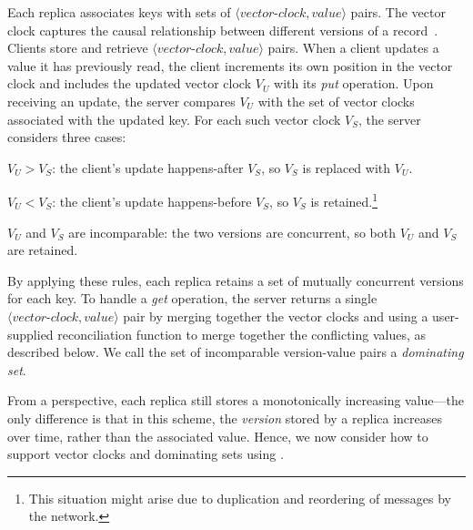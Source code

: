 Each replica associates keys with sets of
$\langle\textit{vector-clock},\textit{value}\rangle$ pairs. The vector clock
captures the causal relationship between different versions of a
record~\cite{Fidge1988,Mattern1989}. Clients store and retrieve
$\langle\textit{vector-clock},\textit{value}\rangle$ pairs. When a client
updates a value it has previously read, the client increments its own position
in the vector clock and includes the updated vector clock $V_U$ with its
\emph{put} operation. Upon receiving an update, the server compares $V_U$ with
the set of vector clocks associated with the updated key. For each such vector
clock $V_S$, the server considers three cases:
\begin{compactenum}
\item $V_U > V_S$: the client's update happens-after $V_S$, so $V_S$ is replaced
  with $V_U$.
\item $V_U < V_S$: the client's update happens-before $V_S$, so $V_S$ is
  retained.\footnote{This situation might arise due to duplication and
    reordering of messages by the network.}
\item $V_U$ and $V_S$ are incomparable: the two versions are concurrent, so
  both $V_U$ and $V_S$ are retained.
\end{compactenum}
By applying these rules, each replica retains a set of mutually concurrent
versions for each key. To handle a \emph{get} operation, the server returns a
single $\langle\textit{vector-clock},\textit{value}\rangle$ pair by merging
together the vector clocks and using a user-supplied reconciliation function to
merge together the conflicting values, as described below. We call the set of
incomparable version-value pairs a \emph{dominating set}.

From a \lang perspective, each replica still stores a monotonically increasing
value---the only difference is that in this scheme, the \emph{version} stored by
a replica increases over time, rather than the associated value. Hence, we now
consider how to support vector clocks and dominating sets using \lang.

